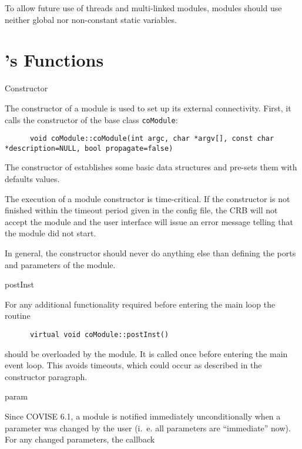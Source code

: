 To allow future use of threads and multi-linked modules, modules should use neither global nor non-constant
static variables.

\section{'s Functions}

{\Large Constructor}
\vspace*{0.5cm}

The constructor of a module is used to set up its external connectivity. First, it calls the constructor of the base
class {\tt coModule}:

\begin{verbatim}
      void coModule::coModule(int argc, char *argv[], const char *description=NULL, bool propagate=false)
\end{verbatim}

The constructor of  establishes some basic data structures and pre-sets 
them with defaults values.

The execution of a module constructor is time-critical. If the constructor is not finished within the timeout period
given in the config file, the CRB will not accept the module and the user interface will issue an error message
telling that the module did not start. 

In general, the constructor should never do anything else than defining the 
ports and parameters of the module.

\vspace*{1cm}
{\Large postInst}
\vspace*{0.5cm}

For any additional functionality required before entering the main loop the routine 

\begin{verbatim}
      virtual void coModule::postInst()
\end{verbatim}

should be overloaded by the module. It is called once before entering the main event loop. This avoids timeouts,
which could occur as described in the constructor paragraph.

\vspace*{1cm}
{\Large param}
\vspace*{0.5cm}

Since COVISE 6.1, a module is notified immediately unconditionally when a parameter was
changed by the user (i.~e. all parameters are ``immediate'' now).
For any changed  parameters, the callback

